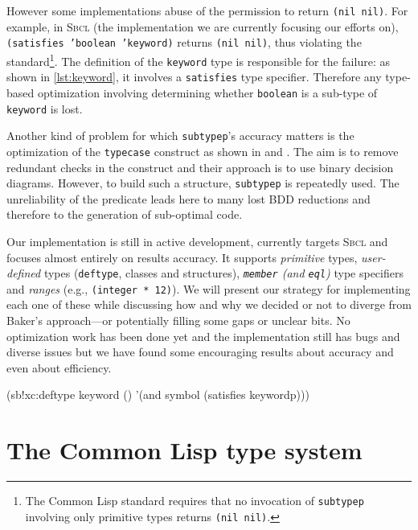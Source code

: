 \documentclass[format=sigconf]{acmart}
\newcommand\code[2][\small]{\sloppy\texttt{#1#2}}
\newcommand\footcode[1]{\code[\scriptsize]{#1}}
\theoremstyle{definition}
\newcommand\sbcl{\textsc{Sbcl}}
\begin{document}
However some implementations abuse of the permission to return \code{(nil nil)}.
For example, in \sbcl{} (the implementation we are currently focusing our
efforts on), {\small\code{(satisfies 'boolean 'keyword)}} returns
\code{(nil nil)}, thus violating the standard\footnote{The Common Lisp standard
  requires that no invocation of \footcode{subtypep} involving only primitive types
  returns \footcode{(nil nil)}.}. The definition of the \code{keyword} type is
responsible for the failure: as shown in \vref{lst:keyword}, it
involves a \code{satisfies} type specifier. Therefore any type-based
optimization involving determining whether \code{boolean} is a sub-type of
\code{keyword} is lost.

Another kind of problem for which \code{subtypep}'s accuracy matters is the
optimization of the \code{typecase} construct as shown in \cite{newton.18.phd}
and \cite{newton.18.els}. The aim is to remove redundant checks in the construct
and their approach is to use binary decision diagrams. However, to build such a
structure, \code{subtypep} is repeatedly used. The unreliability of the
predicate leads here to many lost BDD reductions and therefore to the
generation of sub-optimal code.

Our implementation is still in active development, currently targets
\sbcl{} and focuses almost entirely on results accuracy. It supports
\emph{primitive} types, \emph{user-defined} types (\code{deftype}, classes and structures),
\emph{\code{member} (and \code{eql})} type specifiers and \emph{ranges} (e.g.,
\code{(integer * 12)}). We will present our strategy for implementing each one
of these while discussing how and why we decided or not to diverge from Baker's
\cite{baker1992}
approach---or potentially filling some gaps or unclear bits.
No optimization work has been done yet and the implementation still has
bugs and diverse issues but we have found some encouraging results about
accuracy and even about efficiency.

\begin{listing}[!p]
  \begin{clcode}
(sb!xc:deftype keyword ()
  '(and symbol (satisfies keywordp)))
  \end{clcode}
  \caption{The \code{keyword} type definition in \sbcl}
  \label{lst:keyword}
\end{listing}


\section{The Common Lisp type system}
\end{document}
